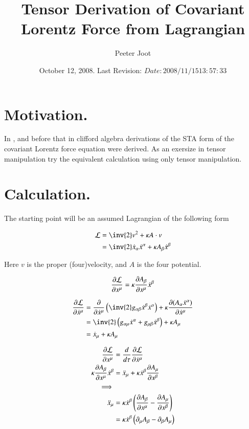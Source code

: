 \documentclass{article}
\title{Tensor Derivation of Covariant Lorentz Force from Lagrangian}
\author{Peeter Joot}
\date{ October 12, 2008.  Last Revision: $Date: 2008/11/15 13:57:33 $ }
\begin{document}
\maketitle{}

\tableofcontents

\section{ Motivation. }

In \cite{PJSrLorentzForce}, and before that in \cite{PJSrLagrangian} clifford
algebra derivations of the STA form of the covariant Lorentz force equation
were derived.  As an exersize in tensor manipulation try the equivalent
calculation using only tensor manipulation.

\section{ Calculation. }

The starting point will be an assumed Lagrangian of the following form

\begin{align}\label{eqn:lagrangian}
\LL &= \inv{2} v^2 + \kappa A \cdot v \\
&= \inv{2} \xdot_\alpha \xdot^\alpha + \kappa A_\beta \xdot^\beta
\end{align}

Here $v$ is the proper (four)velocity, and $A$ is the four potential.

\begin{align*}
\PD{x^\mu}{\LL} = \kappa \PD{x^\mu}{A_\beta} \xdot^\beta
\end{align*}

\begin{align*}
\PD{\xdot^\mu}{\LL}
&= \PD{\xdot^\mu}{} \left( \inv{2} g_{\alpha\beta} \xdot^\beta \xdot^\alpha \right) + \kappa \PD{\xdot^\mu}{(A_\alpha \xdot^\alpha)} \\
&= \inv{2} \left( g_{\alpha\mu} \xdot^\alpha +g_{\mu\beta} \xdot^\beta \right) + \kappa A_\mu \\
&= \xdot_\mu + \kappa A_\mu \\
\end{align*}

\begin{align*}
\PD{x^\mu}{\LL} &= \frac{d}{d\tau} \PD{\xdot^\mu}{\LL} \\
\kappa \PD{x^\mu}{A_\beta} \xdot^\beta &= \xddot_\mu + \kappa \xdot^\beta \PD{x^\beta}{A_\mu} \\
\implies \\
\xddot_\mu
&= \kappa \xdot^\beta \left( \PD{x^\mu}{A_\beta} - \PD{x^\beta}{A_\mu} \right) \\
&= \kappa \xdot^\beta \left( \partial_\mu {A_\beta} - \partial_{\beta}{A_\mu} \right) \\
\end{align*}
\end{document}
